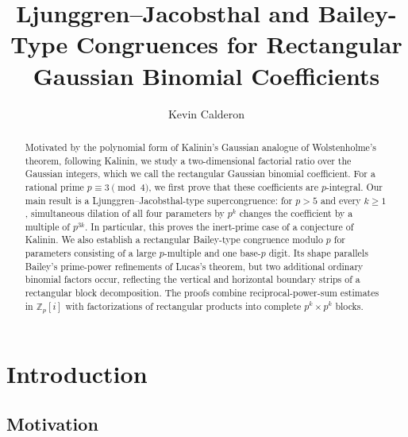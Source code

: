 \documentclass[a4paper,american,11pt]{amsart}
\numberwithin{equation}{section}
\theoremstyle{definition}
\newcommand{\Z}{\mathbb Z}
\begin{document}
\title[Ljunggren--Jacobsthal and Bailey-type congruences]
{Ljunggren--Jacobsthal and Bailey-Type Congruences for Rectangular Gaussian  Binomial Coefficients}

\author{Kevin Calderon}
\address{Departamento de Matem\'aticas, Facultad de Ciencias, Universidad Nacional Aut\'onoma de M\'exico, 04510 Ciudad de M\'exico, Mexico}

\begin{abstract}
Motivated by the polynomial form of Kalinin's Gaussian analogue of Wolstenholme's theorem, following Kalinin, we study a two-dimensional factorial ratio over the Gaussian integers, which we call the rectangular Gaussian binomial coefficient. For a rational prime $p\equiv 3\pmod 4$, we first prove that these coefficients are $p$-integral. Our main result is a Ljunggren--Jacobsthal-type supercongruence: for $p>5$ and every $k\geq 1$, simultaneous dilation of all four parameters by $p^k$ changes the coefficient by a multiple of $p^{3k}$. In particular, this proves the inert-prime case of a conjecture of Kalinin. We also establish a rectangular Bailey-type congruence modulo $p$ for parameters consisting of a large $p$-multiple and one base-$p$ digit. Its shape parallels Bailey's prime-power refinements of Lucas's theorem, but two additional ordinary binomial factors occur, reflecting the vertical and horizontal boundary strips of a rectangular block decomposition. The proofs combine reciprocal-power-sum estimates in $\Z_p[i]$ with factorizations of rectangular products into complete $p^k\times p^k$ blocks.
\end{abstract}


\maketitle

\section{Introduction}

\subsection*{Motivation}
\end{document}
